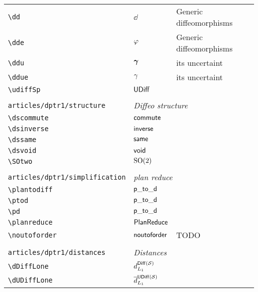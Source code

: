 \begin{longtable}{lll}
 {\color[rgb]{0.5,0.5,0.5}\texttt{\textbackslash dd}} & $\dd$ &  Generic diffeomorphisms\\ 
 {\color[rgb]{0.5,0.5,0.5}\texttt{\textbackslash dde}} & $\varphi$ &  Generic diffeomorphisms\\ 
 {\color[rgb]{0.5,0.5,0.5}\texttt{\textbackslash ddu}} & $\boldsymbol{\gamma}$ &  its uncertaint\\ 
 {\color[rgb]{0.5,0.5,0.5}\texttt{\textbackslash ddue}} & $\gamma$ &  its uncertaint\\ 
 {\color[rgb]{0.5,0.5,0.5}\texttt{\textbackslash udiffSp}} & $\mathsf{UDiff}$ & \\ 
  &  & \\ 
 {\color[rgb]{0.5,0.5,0.5}\texttt{articles/dptr1/structure}} & \multicolumn{2}{l}{\emph{Diffeo structure}}\\ 
 \hline
{\color[rgb]{0.5,0.5,0.5}\texttt{\textbackslash dscommute}} & $\mathsf{commute}$ & \\ 
 {\color[rgb]{0.5,0.5,0.5}\texttt{\textbackslash dsinverse}} & $\mathsf{inverse}$ & \\ 
 {\color[rgb]{0.5,0.5,0.5}\texttt{\textbackslash dssame}} & $\mathsf{same}$ & \\ 
 {\color[rgb]{0.5,0.5,0.5}\texttt{\textbackslash dsvoid}} & $\mathsf{void}$ & \\ 
 {\color[rgb]{0.5,0.5,0.5}\texttt{\textbackslash SOtwo}} & $\mathrm{SO}(2)$ & \\ 
  &  & \\ 
 {\color[rgb]{0.5,0.5,0.5}\texttt{articles/dptr1/simplification}} & \multicolumn{2}{l}{\emph{plan reduce}}\\ 
 \hline
{\color[rgb]{0.5,0.5,0.5}\texttt{\textbackslash plantodiff}} & $\mathsf{p\_to\_d}$ & \\ 
 {\color[rgb]{0.5,0.5,0.5}\texttt{\textbackslash ptod}} & $\mathsf{p\_to\_d}$ & \\ 
 {\color[rgb]{0.5,0.5,0.5}\texttt{\textbackslash pd}} & $\mathsf{p\_to\_d}$ & \\ 
 {\color[rgb]{0.5,0.5,0.5}\texttt{\textbackslash planreduce}} & $\mathsf{PlanReduce}$ & \\ 
 {\color[rgb]{0.5,0.5,0.5}\texttt{\textbackslash noutoforder}} & $\mathsf{noutoforder}$ &  TODO\\ 
  &  & \\ 
 {\color[rgb]{0.5,0.5,0.5}\texttt{articles/dptr1/distances}} & \multicolumn{2}{l}{\emph{Distances}}\\ 
 \hline
{\color[rgb]{0.5,0.5,0.5}\texttt{\textbackslash dDiffLone}} & $\dDiffLone$ & \\ 
 {\color[rgb]{0.5,0.5,0.5}\texttt{\textbackslash dUDiffLone}} & $\dUDiffLone$ & \\ 

\end{longtable}
